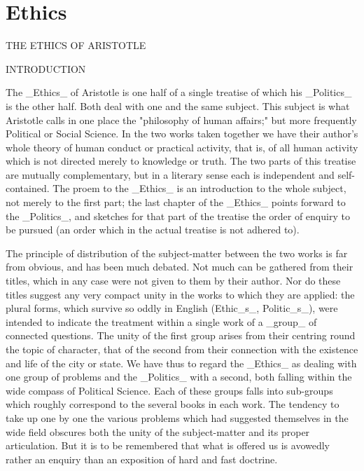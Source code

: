 \chapter{Ethics} %
\label{cha:ethics}

THE ETHICS OF ARISTOTLE


INTRODUCTION

The _Ethics_ of Aristotle is one half of a single treatise of which his
_Politics_ is the other half. Both deal with one and the same subject.
This subject is what Aristotle calls in one place the "philosophy of
human affairs;" but more frequently Political or Social Science. In the
two works taken together we have their author's whole theory of human
conduct or practical activity, that is, of all human activity which
is not directed merely to knowledge or truth. The two parts of this
treatise are mutually complementary, but in a literary sense each
is independent and self-contained. The proem to the _Ethics_ is an
introduction to the whole subject, not merely to the first part; the
last chapter of the _Ethics_ points forward to the _Politics_, and
sketches for that part of the treatise the order of enquiry to be
pursued (an order which in the actual treatise is not adhered to).

The principle of distribution of the subject-matter between the two
works is far from obvious, and has been much debated. Not much can be
gathered from their titles, which in any case were not given to them by
their author. Nor do these titles suggest any very compact unity in the
works to which they are applied: the plural forms, which survive so
oddly in English (Ethic_s_, Politic_s_), were intended to indicate the
treatment within a single work of a _group_ of connected questions. The
unity of the first group arises from their centring round the topic of
character, that of the second from their connection with the existence
and life of the city or state. We have thus to regard the _Ethics_ as
dealing with one group of problems and the _Politics_ with a second,
both falling within the wide compass of Political Science. Each of these
groups falls into sub-groups which roughly correspond to the several
books in each work. The tendency to take up one by one the various
problems which had suggested themselves in the wide field obscures both
the unity of the subject-matter and its proper articulation. But it is
to be remembered that what is offered us is avowedly rather an enquiry
than an exposition of hard and fast doctrine.

